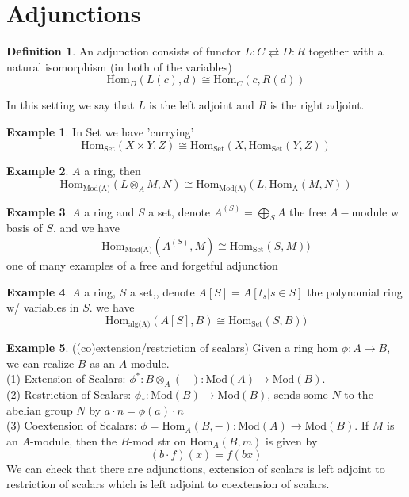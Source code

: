 \documentclass{article}
\theoremstyle{definition}
\newtheorem{example}{Example}[section]
\theoremstyle{definition}
\newtheorem{definition}{Definition}[section]
\theoremstyle{remark}
\begin{document}
\section{ Adjunctions}

\begin{definition}
	An adjunction consists of functor $L:C \rightleftarrows D: R$ together with a natural isomorphism (in both of the variables)
	\[\text{Hom}_D (L(c), d) \cong \text{Hom}_C(c, R(d))\]
\end{definition}

In this setting we say that $L$ is the left adjoint and $R$ is the right adjoint.
\begin{example}
	In Set we have 'currying'
	\[\text{Hom}_{\text{Set}}(X \times Y, Z) \cong \text{Hom}_{\text{Set}}(X, \text{Hom}_{\text{Set}}(Y,Z))\]
\end{example}
 
\begin{example}
	$A$ a ring, then 
\[\text{Hom}_{\text{Mod(A)}}(L \otimes_A M, N) \cong \text{Hom}_{\text{Mod(A)}}(L, \text{Hom}_{\text{A}}(M,N))\]

\end{example}

 \begin{example}
	 $A$ a ring and $S$ a set, denote $A^{(S)} = \bigoplus_S A$ the free $A-$module w basis of $S$.
	 and we have 
	 \[\text{Hom}_{\text{Mod(A)}}(A^{(S)}, M) \cong \text{Hom}_{\text{Set}}(S, M))\]
one of many examples of a free and forgetful adjunction

\end{example}
\begin{example}
	$A$ a ring, $S$ a set,, denote $A[S] = A[t_s|s \in S]$  the polynomial ring w/ variables in $S$.
	we have
	\[\text{Hom}_{\text{alg(A)}}(A[S], B) \cong \text{Hom}_{\text{Set}}(S, B))\]

\end{example}

\begin{example}
	((co)extension/restriction of scalars) Given a  ring hom $\phi: A \to B$, we can realize $B$ as an $A$-module.\\
	\indent	(1) Extension of Scalars: $\phi^*: B \otimes_A (-): \text{Mod}(A) \to \text{Mod}(B)$.\\
	\indent (2) Restriction of Scalars: $\phi_*: \text{Mod}(B) \to \text{Mod}(B)$, sends some $N$ to the abelian group $N$ by $a \cdot n = \phi(a) \cdot n$\\
	\indent (3) Coextension of Scalars: $\phi = \text{Hom}_A(B, -): \text{Mod}(A) \to \text{Mod}(B)$.
	If $M$ is an $A$-module, then the $B$-mod str on $\text{Hom}_A(B,m)$ is given by 
	\[(b \cdot f)(x) = f(bx)\]
We can check that there are adjunctions, extension of scalars is left adjoint to restriction of scalars which is left adjoint to coextension of scalars.
\end{example}
\end{document}
